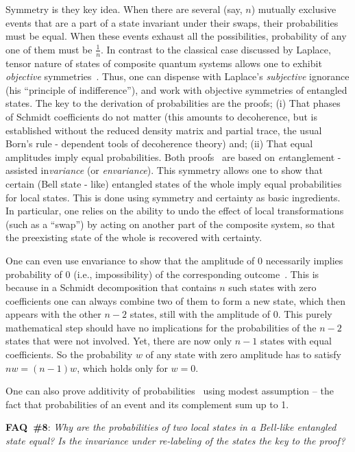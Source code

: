 \documentclass[aps,amsmath,amssymb,amsfonts,floatfix]{revtex4-1}
\newcommand{\+}         {\dagger}
\begin{document}
{{{Symmetry is they key idea. When there are several (say, $n$) mutually exclusive events that are a part of a state invariant under their swaps, their probabilities must be equal. When these events exhaust all the possibilities, probability of any one of them must be $\frac 1 n$. In contrast to the classical case discussed by Laplace, tensor nature of states of composite quantum systems allows one to exhibit {\it objective} symmetries~\cite{75,76,78,Z07a}. Thus, one can dispense with Laplace's  {\it subjective} ignorance (his ``principle of indifference''), and work with objective symmetries of entangled states. The key to the derivation of probabilities are the proofs; (i) That phases of Schmidt coefficients do not matter (this amounts to decoherence, but is established without the reduced density matrix and partial trace, the usual Born's rule - dependent tools of decoherence theory) and; (ii) That equal amplitudes imply equal probabilities. Both proofs~\cite{75,76,78,Z07a} are based on {\it en}tanglement - assisted in{\it variance} (or {\it envariance}). This symmetry allows one to show that certain (Bell state - like) entangled states of the whole imply equal probabilities for local states. This is done using symmetry and certainty as basic ingredients. In particular, one relies on the ability to undo the effect of local transformations (such as a ``swap'') by acting on another part of the composite system, so that the preexisting state of the whole is recovered with certainty. 

One can even use envariance to show that the amplitude of 0 necessarily implies probability of 0 (i.e., impossibility) of the corresponding outcome~\cite{Z07a}. This is because in a Schmidt decomposition that contains $n$ such states with zero coefficients one can always combine two of them to form a new state, which then appears with the other $n-2$ states, still with the amplitude of 0. This purely mathematical step should have no implications for the probabilities of the $n-2$ states that were not involved. Yet, there are now only $n-1$ states with equal coefficients. So the probability $w$ of any state with zero amplitude has to satisfy $nw = (n-1)w$, which holds only for $w=0$. 

One can also prove additivity of probabilities~\cite{78} using modest assumption -- the fact that probabilities of an event and its complement sum up to 1.

{\bf FAQ~\#8}: {\it Why are the probabilities of two local states in a Bell-like entangled state equal? Is the invariance under re-labeling of the states the key to the proof?} 

}}}
\end{document}
